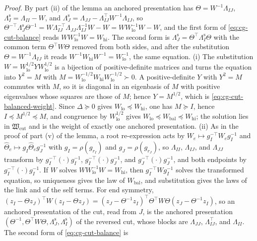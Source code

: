\noindent\emph{Proof.}
By part (ii) of the lemma an anchored presentation has $\Theta=W^{-1}\Lambda_{IJ}$,
$\Lambda^{\mathrm s}_I=\Lambda_{II}-W$, and $\Lambda^{\mathrm s}_J=\Lambda_{JJ}-\Lambda_{IJ}^\top W^{-1}\Lambda_{IJ}$,
so $\Theta^{-\top}\Lambda^{\mathrm s}_J\Theta^{-1}=W\Lambda_{IJ}^{-\top}\Lambda_{JJ}\Lambda_{IJ}^{-1}W-W
=WW_{\mathrm{lo}}^{-1}W-W$, and the first form of \eqref{eq:cg-cut-balance} reads
$WW_{\mathrm{lo}}^{-1}W=W_{\mathrm{hi}}$. The second form is
$\Lambda^{\mathrm s}_J=\Theta^\top\Lambda^{\mathrm s}_I\Theta$ with the common term $\Theta^\top W\Theta$
removed from both sides, and after the substitution $\Theta=W^{-1}\Lambda_{IJ}$ it reads
$W^{-1}W_{\mathrm{hi}}W^{-1}=W_{\mathrm{lo}}^{-1}$, the same equation. (i) The substitution
$W=W_{\mathrm{lo}}^{1/2}YW_{\mathrm{lo}}^{1/2}$ is a bijection of positive-definite matrices and turns the
equation into $Y^2=M$ with $M=W_{\mathrm{lo}}^{-1/2}W_{\mathrm{hi}}W_{\mathrm{lo}}^{-1/2}\succ0$. A
positive-definite $Y$ with $Y^2=M$ commutes with $M$, so it is diagonal in an eigenbasis of $M$ with
positive eigenvalues whose squares are those of $M$; hence $Y=M^{1/2}$, which is
\eqref{eq:cg-cut-balanced-weight}. Since $\Delta\succeq0$ gives $W_{\mathrm{lo}}\preceq W_{\mathrm{hi}}$, one has
$M\succeq I$, hence $I\preceq M^{1/2}\preceq M$, and congruence by $W_{\mathrm{lo}}^{1/2}$ gives
$W_{\mathrm{lo}}\preceq W_{\mathrm{bal}}\preceq W_{\mathrm{hi}}$; the solution lies in $\mathfrak W_{\mathrm{cut}}$ and
is the weight of exactly one anchored presentation. (ii) As in the proof of part (v) of the lemma, a
root re-expression acts by $W_e\mapsto g_I^{-\top}W_eg_I^{-1}$ and
$\widehat\Theta_e\mapsto g_I\widehat\Theta_eg_J^{-1}$ with $g_I=\rho(g_{r_I})$ and $g_J=\rho(g_{r_J})$, so
$\Lambda_{II}$, $\Lambda_{IJ}$, and $\Lambda_{JJ}$ transform by $g_I^{-\top}(\cdot)g_I^{-1}$,
$g_I^{-\top}(\cdot)g_J^{-1}$, and $g_J^{-\top}(\cdot)g_J^{-1}$, and both endpoints by
$g_I^{-\top}(\cdot)g_I^{-1}$. If $W$ solves $WW_{\mathrm{lo}}^{-1}W=W_{\mathrm{hi}}$, then $g_I^{-\top}Wg_I^{-1}$
solves the transformed equation, so uniqueness gives the law of $W_{\mathrm{bal}}$, and substitution gives
the laws of the link and of the self terms. For end symmetry,
$(z_I-\Theta z_J)^\top W(z_I-\Theta z_J)=(z_J-\Theta^{-1}z_I)^\top\Theta^\top W\Theta(z_J-\Theta^{-1}z_I)$, so an
anchored presentation of the cut, read from $J$, is the anchored presentation
$(\Theta^{-1},\Theta^\top W\Theta,\Lambda^{\mathrm s}_J,\Lambda^{\mathrm s}_I)$ of the reversed cut, whose blocks
are $\Lambda_{JJ}$, $\Lambda_{IJ}^\top$, and $\Lambda_{II}$. The second form of \eqref{eq:cg-cut-balance} is

